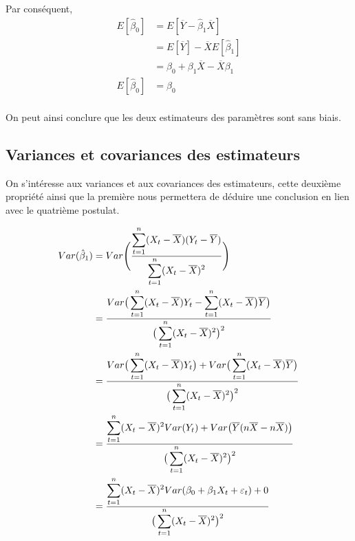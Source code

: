 \documentclass[11pt,french]{report}
\begin{document}
Par conséquent,
\begin{align*}
E[\hat{\beta}_0] &= E[\overline{Y} - \hat{\beta}_1 \overline{X}] \\
&= E[\overline{Y}] - \overline{X} E[\hat{\beta}_1]  \\
&= \beta_0 + \beta_1\overline{X} - \overline{X}\beta_1 \\
E[\hat{\beta}_0]  &= \beta_0 \\
\end{align*}

On peut ainsi conclure que les deux estimateurs des paramètres sont sans biais.

\subsection{Variances et covariances des estimateurs}
On s'intéresse aux variances et aux covariances des estimateurs, cette deuxième propriété ainsi que la première nous permettera de déduire une conclusion en lien avec le quatrième postulat.

\begin{align*}
Var(\hat{\beta}_1) &= Var\Bigg( \frac{\displaystyle\displaystyle\sum_{t=1}^n(X_t- \overline{X})(Y_t - \overline{Y})}{\displaystyle\displaystyle\sum_{t=1}^n(X_t - \overline{X})^2} \Bigg)\\
&= \frac{Var\big( \displaystyle\displaystyle\sum_{t=1}^n(X_t- \overline{X})Y_t - \displaystyle\displaystyle\sum_{t=1}^n(X_t- \overline{X} \big)\overline{Y}\big)}{\big( \displaystyle\displaystyle\sum_{t=1}^n(X_t - \overline{X})^2 \big)^2} \\
&= \frac{Var\big( \displaystyle\displaystyle\sum_{t=1}^n(X_t- \overline{X})Y_t\big) + Var\big(\displaystyle\displaystyle\sum_{t=1}^n(X_t- \overline{X})\overline{Y}\big)}{\big( \displaystyle\displaystyle\sum_{t=1}^n(X_t - \overline{X})^2 \big)^2} \\
&= \frac{\displaystyle\displaystyle\sum_{t=1}^n(X_t- \overline{X})^2 Var(Y_t) + Var\big(\overline{Y}(n\overline{X}- n\overline{X})\big)}{\big( \displaystyle\displaystyle\sum_{t=1}^n(X_t - \overline{X})^2 \big)^2} \\
&= \frac{\displaystyle\displaystyle\sum_{t=1}^n(X_t- \overline{X})^2 Var(\beta_0 + \beta_1X_t + \varepsilon_t) + 0}{\big( \displaystyle\displaystyle\sum_{t=1}^n(X_t - \overline{X})^2 \big)^2} \\
\end{align*}
\end{document}
